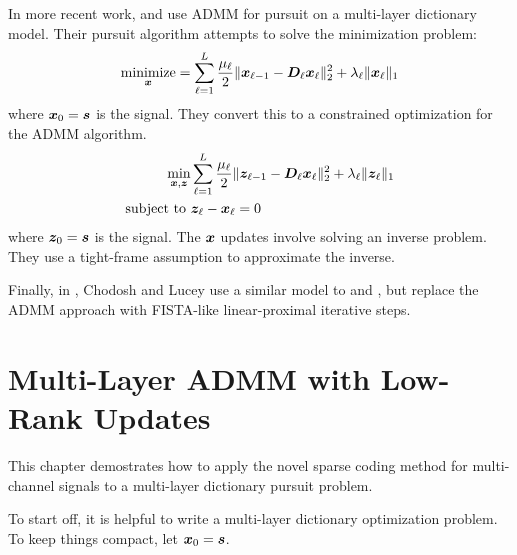 In more recent work, \cite{murdock2018deep} and \cite{chodosh2018deep} use ADMM for pursuit on a multi-layer dictionary model. Their pursuit algorithm attempts to solve the minimization problem:
\begin{equation}
\operatorname*{\text{minimize}}_{\bm{x}} = \sum_{\ell = 1}^{L} \frac{\mu_{\ell}}{2}\|\bm{x}_{\ell - 1} -\bm{D}_{\ell}\bm{x}_{\ell}\|_2^2 + \lambda_{\ell}\|\bm{x}_{\ell}\|_1
\end{equation}
where $\bm{x}_0 = \bm{s}$ is the signal. They convert this to a constrained optimization for the ADMM algorithm.
\begin{equation}
\begin{aligned}
\min_{\bm{x},\bm{z}} & \sum_{\ell = 1}^{L} \frac{\mu_{\ell}}{2}\|\bm{z}_{\ell - 1} -\bm{D}_{\ell}\bm{x}_{\ell}\|_2^2 + \lambda_{\ell}\|\bm{z}_{\ell}\|_1 \\
\text{subject to } & \bm{z}_{\ell} - \bm{x}_{\ell} = 0
\end{aligned} \label{equation:ADMM Multi-Layer Pursuit Objective}
\end{equation}
where $\bm{z}_0 = \bm{s}$ is the signal. The $\bm{x}$ updates involve solving an inverse problem. They use a tight-frame assumption to approximate the inverse.

Finally, in \cite{chodosh2020use}, Chodosh and Lucey use a similar model to \cite{murdock2018deep} and \cite{chodosh2018deep}, but replace the ADMM approach with FISTA-like linear-proximal iterative steps.

\section{Multi-Layer ADMM with Low-Rank Updates}
This chapter demostrates how to apply the novel sparse coding method for multi-channel signals to a multi-layer dictionary pursuit problem.

To start off, it is helpful to write a multi-layer dictionary optimization problem. To keep things compact, let $\bm{x}_0 = \bm{s}$.

